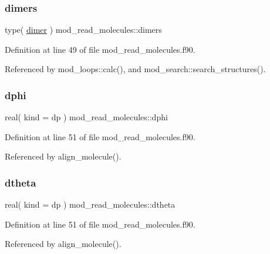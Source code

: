 \subsubsection{\texorpdfstring{dimers}{dimers}}
{\footnotesize\ttfamily type( \hyperlink{structmod__read__molecules_1_1dimer}{dimer} ) mod\+\_\+read\+\_\+molecules\+::dimers}



Definition at line 49 of file mod\+\_\+read\+\_\+molecules.\+f90.



Referenced by mod\+\_\+loops\+::calc(), and mod\+\_\+search\+::search\+\_\+structures().

\mbox{\label{namespacemod__read__molecules_a4a9088b19ec4e6043af7894bfa20e87b}} 
\subsubsection{\texorpdfstring{dphi}{dphi}}
{\footnotesize\ttfamily real( kind = dp ) mod\+\_\+read\+\_\+molecules\+::dphi}



Definition at line 51 of file mod\+\_\+read\+\_\+molecules.\+f90.



Referenced by align\+\_\+molecule().

\mbox{\label{namespacemod__read__molecules_ad9dc9f5af77e0db504939d241333d857}} 
\subsubsection{\texorpdfstring{dtheta}{dtheta}}
{\footnotesize\ttfamily real( kind = dp ) mod\+\_\+read\+\_\+molecules\+::dtheta}



Definition at line 51 of file mod\+\_\+read\+\_\+molecules.\+f90.



Referenced by align\+\_\+molecule().

\mbox{\label{namespacemod__read__molecules_a8511d6e8d8197d2f03d47376a43e50ce}} 
